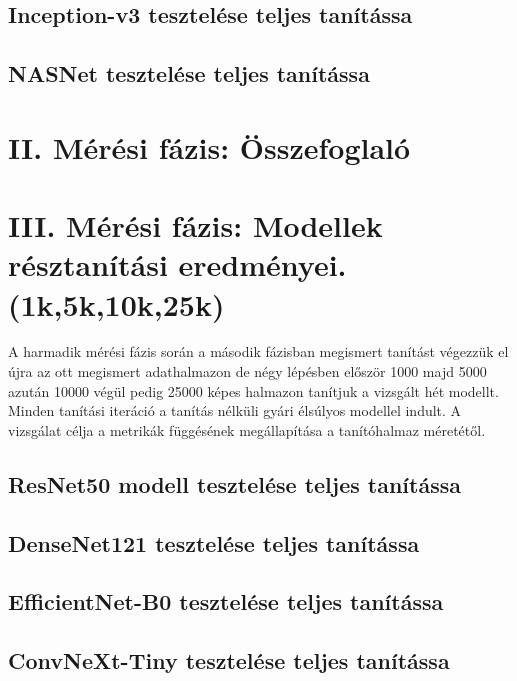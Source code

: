 \documentclass[	
  noindent
]{elteikthesis}[2024/04/26]
\begin{document}
    \subsection{Inception-v3 tesztelése teljes tanítássa}
      
    \subsection{NASNet tesztelése teljes tanítássa}
      

  \section{II. Mérési fázis: Összefoglaló}
    

  \section{III. Mérési fázis: Modellek résztanítási eredményei. (1k,5k,10k,25k)}
      A harmadik mérési fázis során a második fázisban megismert tanítást végezzük el újra az ott megismert adathalmazon de négy lépésben először 1000 majd 5000 azután 10000 végül pedig 25000 képes halmazon tanítjuk a vizsgált hét modellt. Minden tanítási iteráció a tanítás nélküli gyári élsúlyos modellel indult. A vizsgálat célja a metrikák függésének megállapítása a tanítóhalmaz méretétől.

    \subsection{ResNet50 modell tesztelése teljes tanítássa}
      
    \subsection{DenseNet121 tesztelése teljes tanítássa}
      
    \subsection{EfficientNet-B0 tesztelése teljes tanítássa}
      
    \subsection{ConvNeXt-Tiny tesztelése teljes tanítássa}
      
\end{document}
